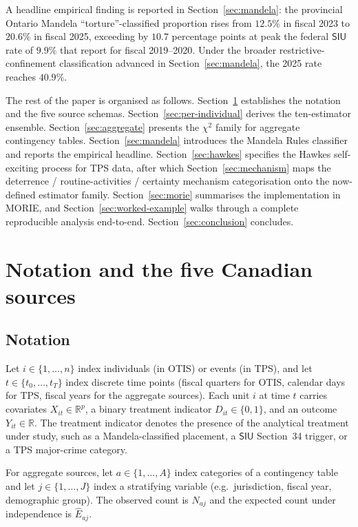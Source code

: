 \documentclass[article,shortnames,nojss]{jss}
\newcommand{\R}{\mathbb{R}}
\providecommand{\Rset}{\mathbb{R}}
\newcommand{\SIU}{\textsf{SIU}}
\begin{document}
A headline empirical finding is reported in
Section~\ref{sec:mandela}: the provincial Ontario Mandela
``torture''-classified proportion rises from $12.5\%$ in fiscal
2023 to $20.6\%$ in fiscal 2025, exceeding by $10.7$ percentage
points at peak the federal $\SIU$ rate of $9.9\%$ that
\citet{SprottDoob2023} report for fiscal 2019--2020. Under the
broader restrictive-confinement classification advanced in
Section~\ref{sec:mandela}, the 2025 rate reaches $40.9\%$.

The rest of the paper is organised as follows.
Section~\ref{sec:notation} establishes the notation and the five
source schemas. Section~\ref{sec:per-individual} derives the
ten-estimator ensemble. Section~\ref{sec:aggregate} presents the
$\chi^{2}$ family for aggregate contingency tables.
Section~\ref{sec:mandela} introduces the Mandela Rules classifier
and reports the empirical headline.  Section~\ref{sec:hawkes}
specifies the Hawkes self-exciting process for TPS data, after
which Section~\ref{sec:mechanism} maps the
deterrence / routine-activities / certainty mechanism
categorisation onto the now-defined estimator family.
Section~\ref{sec:morie} summarises the implementation in MORIE,
and Section~\ref{sec:worked-example} walks through a complete
reproducible analysis end-to-end.  Section~\ref{sec:conclusion}
concludes.

\section{Notation and the five Canadian sources}
\label{sec:notation}

\subsection{Notation}

Let $i \in \{1, \dots, n\}$ index individuals (in OTIS) or events
(in TPS), and let $t \in \{t_0, \dots, t_T\}$ index discrete time
points (fiscal quarters for OTIS, calendar days for TPS, fiscal
years for the aggregate sources). Each unit $i$ at time $t$
carries covariates $X_{it} \in \Rset^{p}$, a binary treatment
indicator $D_{it} \in \{0,1\}$, and an outcome $Y_{it} \in \R$.
The treatment indicator denotes the presence of the analytical
treatment under study, such as a Mandela-classified placement, a
$\SIU$ Section~34 trigger, or a TPS major-crime category.

For aggregate sources, let $a \in \{1, \dots, A\}$ index categories
of a contingency table and let $j \in \{1, \dots, J\}$ index a
stratifying variable (e.g.\ jurisdiction, fiscal year, demographic
group). The observed count is $N_{aj}$ and the expected count under
independence is $\hat{E}_{aj}$.
\end{document}
